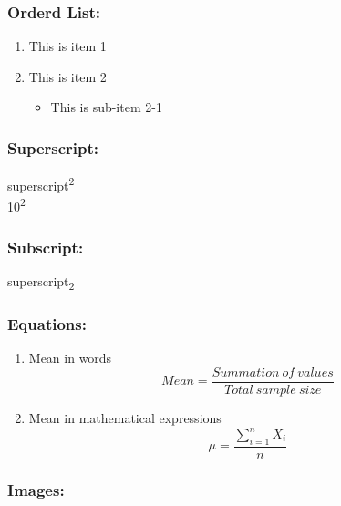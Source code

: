 \documentclass[]{article}
\providecommand{\tightlist}{%
  \setlength{\itemsep}{0pt}\setlength{\parskip}{0pt}}
\begin{document}
\hypertarget{orderd-list}{%
\subsubsection{Orderd List:}\label{orderd-list}}

\begin{enumerate}
\def\labelenumi{\arabic{enumi}.}
\tightlist
\item
  This is item 1
\item
  This is item 2

  \begin{itemize}
  \tightlist
  \item
    This is sub-item 2-1
  \end{itemize}
\end{enumerate}

\hypertarget{superscript}{%
\subsubsection{Superscript:}\label{superscript}}

superscript\textsuperscript{2}\\
10\textsuperscript{2}

\hypertarget{subscript}{%
\subsubsection{Subscript:}\label{subscript}}

superscript\textsubscript{2}

\hypertarget{equations}{%
\subsubsection{Equations:}\label{equations}}

\begin{enumerate}
\def\labelenumi{\arabic{enumi}.}
\item
  Mean in words\\
  \[{Mean} = \frac{Summation~of~values}{Total~sample~size}\]
\item
  Mean in mathematical expressions
  \[{\mu} = \frac{\sum_{i=1}^n X_i}{n}\]
\end{enumerate}

\hypertarget{images}{%
\subsubsection{Images:}\label{images}}
\end{document}
